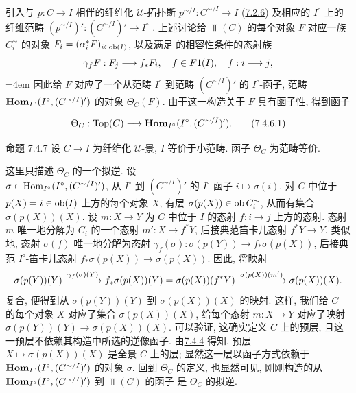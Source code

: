 \subsubsection{}

引入与 $p:C\to I$ 相伴的纤维化 $𝒰$-拓扑斯 $p^{\sim/I}:C^{\sim/I}\to I$
(\hyperref[VI.subsubsec7.2.6]{7.2.6})
及相应的 $I^{\circ}$ 上的纤维范畴
$(p^{\sim/I})':(C^{\sim/I})'\to I^{\circ}$
.
上述讨论给 $\Top(C)$ 的每个对象 $F$
对应一族 $C^{\sim}_i$ 的对象 $F_i=(\alpha^{\ast}_iF)_{i\in\operatorname{ob}(I)}$,
以及满足 的相容性条件的态射族
$$
\gamma_f F : F_j \to f_{\ast} F_i,\quad f\in F1(I),\quad f : i \to j{\quoi},
$$
\begingroup{}\emergencystretch=4em
因此给 $F$ 对应了一个从范畴 $I^{\circ}$ 到范畴 $(C^{\sim/I})'$ 的 $I^{\circ}$-函子,
\ie 范畴 $\operatorname{\mathbf{Hom}}_{I^{\circ}}(I^{\circ},(C^{\sim/I})')$ 的对象 $\Theta_C(F)$.
由于这一构造关于 $F$ 具有函子性, 得到函子\par\endgroup
\begin{equation*}
\Theta_C : \Top(C) \to \Hhom_{I^{\circ}} (I^{\circ},
(C^{\sim/I})'){\quoi}.\tag{7.4.6.1}
\end{equation*}

\begin{enonce*}{命题 7.4.7}
设 $C\to I$ 为纤维化 $\mathcal{U}$-景, $I$ 等价于小范畴.
函子 $\Theta_C$  为范畴等价.
\end{enonce*}

这里只描述 $\Theta_C$ 的一个拟逆.
设 \\
$\sigma\in\operatorname{Hom}_{I^{\circ}}(I^{\circ},(C^{\sim/I})')$,
\ie 从 $I^{\circ}$ 到 $(C^{\sim/I})'$ 的 $I^{\circ}$-函子 $i\mapsto\sigma(i)$.
对 $C$ 中位于 $p(X)=i\in\operatorname{ob}(I)$ 上方的每个对象 $X$,
有层 $\sigma(p(X))\in\operatorname{ob} C^{\sim}_i$,
从而有集合 $\sigma(p(X))(X)$.
设 $m:X\to Y$ 为 $C$ 中位于 $I$ 的态射 $f:i\to j$ 上方的态射.
态射 $m$ 唯一地分解为 $C_i$ 的一个态射 $m':X\to f^{\ast}Y$,
后接典范笛卡儿态射 $f^{\ast}Y\to Y$.
类似地, 态射 $\sigma(f)$ 唯一地分解为态射
$\gamma_f(\sigma):\sigma(p(Y))\to f_{\ast}\sigma(p(X))$,
后接典范 $I^{\circ}$-笛卡儿态射 $f_{\ast}\sigma(p(X))\to\sigma(p(X))$.
因此, 将映射
$$
\sigma(p(Y))(Y) \xrightarrow{\gamma_f(\sigma)(Y)}
f_{\ast}\sigma(p(X))(Y) =
\sigma(p(X))(f^{\ast}Y) \xrightarrow{\sigma(p(X))(m')}
\sigma(p(X))(X){}.
$$
复合, 便得到从 $\sigma(p(Y))(Y)$ 到 $\sigma(p(X))(X)$ 的映射\pageoriginale.
这样, 我们给 $C$ 的每个对象 $X$ 对应了集合 $\sigma(p(X))(X)$,
给每个态射 $m:X\to Y$ 对应了映射 $\sigma(p(Y))(Y)\to\sigma(p(X))(X)$.
可以验证, 这确实定义 $C$ 上的预层,
且这一预层不依赖其构造中所选的逆像函子.
由\hyperref[VI.prop7.4.4]{7.4.4} 得知,
预层 $X\mapsto\sigma(p(X))(X)$ 是全景 $C$ 上的层;
显然这一层以函子方式依赖于 $\operatorname{\mathbf{Hom}}_{I^{\circ}}(I^{\circ},(C^{\sim/I})')$ 的对象 $\sigma$.
回到 $\Theta_C$ 的定义, 也显然可见,
刚刚构造的从 $\operatorname{\mathbf{Hom}}_{I^{\circ}}(I^{\circ},(C^{\sim/I})')$ 到 $\Top(C)$ 的函子
是 $\Theta_C$ 的拟逆.

